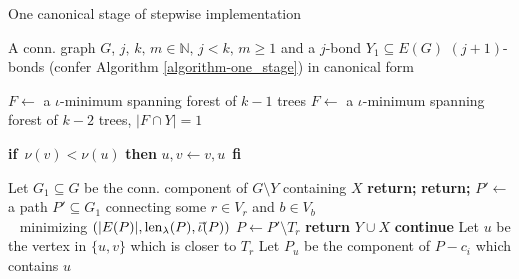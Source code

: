 \begin{algorithm}
	\caption{One canonical stage of stepwise implementation}
	\label{algorithm-can_one_step}
\begin{algorithmic}[1]
	\Require A conn. graph $G$, $j,\, k,\, m \in \mathbb{N},\, j < k,\, m \geq 1$ and a $j$-bond $Y_1 \subseteq E(G)$
	\Ensure $(j+1)$-bonds (confer Algorithm \ref{algorithm-one_stage}) in canonical form

		\State $F \leftarrow$ a $\iota$-minimum spanning forest of $k-1$ trees
		\Else
		\State $F \leftarrow$ a $\iota$-minimum spanning forest of $k-2$ trees, $\lvert F \cap Y\rvert = 1$
	\EndIf

		\State \textbf{if} $ \, \nu(v) < \nu(u)$ \textbf{then}  $u,v \leftarrow v, u \,$ \textbf{fi}
		\State {}
	\EndFor

	\State Let $G_1 \subseteq G$ be the conn. component of $G \setminus Y$ containing $X$
		\State \textbf{return;}
	\EndIf
		\State \textbf{return;}
	\EndIf
	\State $P' \leftarrow$ a path $P' \subseteq G_1$ connecting some $r \in V_r$ and $b \in V_b$ \\
	\qquad \quad \,\,\, minimizing $(\lvert E(P) \rvert, \operatorname{len}_\lambda(P), \vec{\iota}(P) )$
	\State $P \leftarrow P' \setminus T_r$
		\State \textbf{return} $Y \cup X$ 
	\Else
				\State \textbf{continue}
			\EndIf
			\State Let $u$ be the vertex in $\{u,v\}$ which is closer to $T_r$
			\State Let $P_u$ be the component of $P - c_i$ which contains $u$
			\State {}
		\EndFor
	\EndIf

	\EndProcedure
\end{algorithmic}
\end{algorithm}

\clearpage


